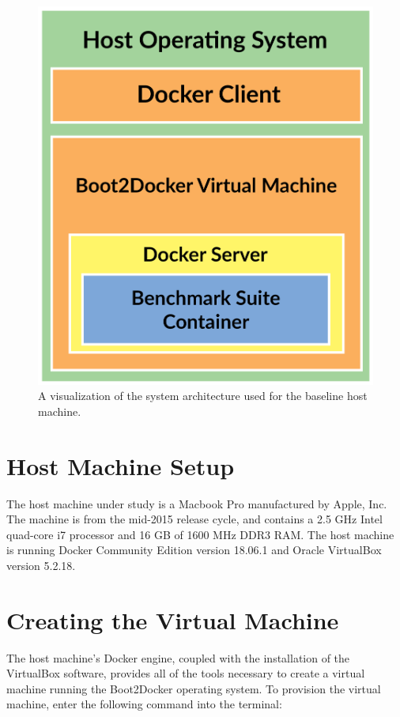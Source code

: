 \documentclass[sigconf]{acmart}
\begin{document}
\begin{figure}[!ht]
  \centering\includegraphics[width=\columnwidth]{images/SysArch1.png}
  \caption{A visualization of the system architecture used for the baseline host machine.}\label{f:sysarch1}
\end{figure}

\section{Host Machine Setup}

The host machine under study is a Macbook Pro manufactured by Apple, Inc. The machine is from the mid-2015 release cycle, and contains a 2.5 GHz Intel quad-core i7 processor and 16 GB of 1600 MHz DDR3 RAM. The host machine is running Docker Community Edition version 18.06.1 and Oracle VirtualBox version 5.2.18.

\section{Creating the Virtual Machine}

The host machine's Docker engine, coupled with the installation of the VirtualBox software, provides all of the tools necessary to create a virtual machine running the Boot2Docker operating system. To provision the virtual machine, enter the following command into the terminal:
\end{document}
